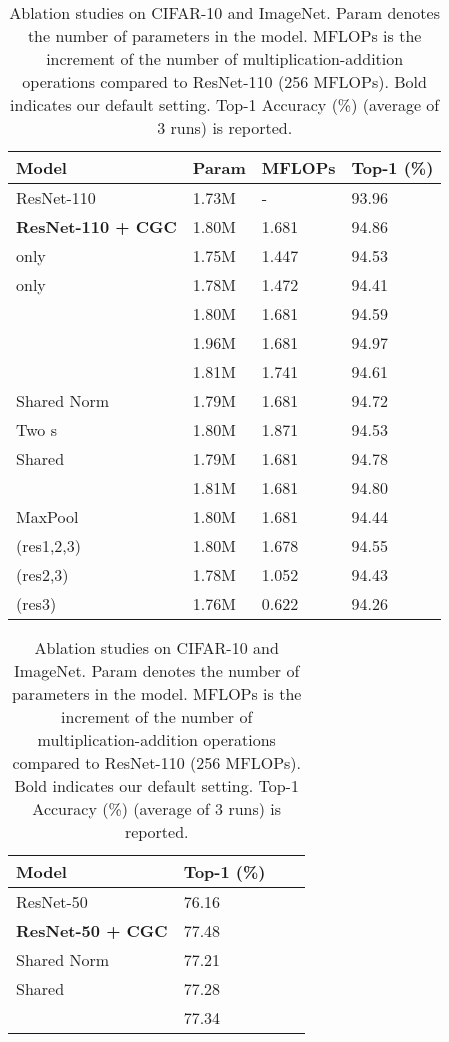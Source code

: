 \documentclass[runningheads]{llncs}
\begin{document}
\begin{table}[t] 
\caption{Ablation studies on CIFAR-10 and ImageNet. Param denotes the number of parameters in the model. MFLOPs is the increment of the number of multiplication-addition operations compared to ResNet-110 (256 MFLOPs). Bold indicates our default setting. Top-1 Accuracy (\%) (average of 3 runs) is reported.}

  \begin{minipage}[b]{0.5\textwidth} 
    \tiny
    \centering
    \label{tab:cifar}
    \begin{tabular}{llll}
    \hline
    Model  & Param & MFLOPs & Top-1 (\%) 
    \\ \hline 
    ResNet-110~\cite{he2016identity}         & 1.73M & - & 93.96  \\ 
    \textbf{ResNet-110 + CGC}        & 1.80M & 1.681 & 94.86  \\ 
    \hline
    only          & 1.75M & 1.447 & 94.53  \\ 
    only          & 1.78M & 1.472 & 94.41  \\ 
             & 1.80M & 1.681 & 94.59  \\ 
    \hline
                  & 1.96M & 1.681 & 94.97  \\
          & 1.81M & 1.741 & 94.61  \\ 
    \hline
    Shared Norm         & 1.79M & 1.681 & 94.72 \\
    Two s              & 1.80M & 1.871 & 94.53  \\
    Shared          & 1.79M & 1.681 & 94.78  \\
    \hline
                  & 1.81M & 1.681 & 94.80  \\
     MaxPool              & 1.80M & 1.681 & 94.44  \\
    \hline
    (res1,2,3)         & 1.80M & 1.678 & 94.55  \\
    (res2,3)         & 1.78M & 1.052 & 94.43  \\
    (res3)         & 1.76M & 0.622 & 94.26  \\
    \hline
    
    \end{tabular} 
  \end{minipage}\begin{minipage}[b]{0.5\textwidth} 
    \tiny
    \centering
    \label{tab:abimg}
    \begin{tabular}{llll}
    \hline
    Model   & Top-1 (\%)
    \\ \hline 
    ResNet-50~\cite{He_2016_CVPR}          & 76.16  \\ 
    \textbf{ResNet-50 + CGC}         & 77.48  \\ 
   
    \hline
    Shared Norm          & 77.21 \\
    Shared         & 77.28  \\
    \hline
                   & 77.34  \\

    \hline
    
    \end{tabular}
  \end{minipage} 
\end{table}
\end{document}

